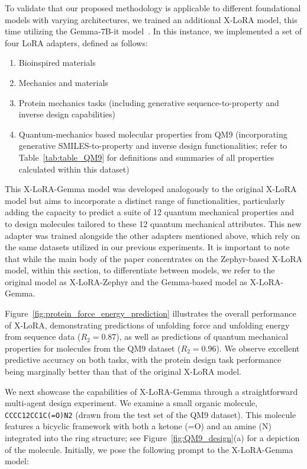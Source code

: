 To validate that our proposed methodology is applicable to different foundational models with varying architectures, we trained an additional X-LoRA model, this time utilizing the Gemma-7B-it model~\cite{Google/gemma-7b-itFace}. In this instance, we implemented a set of four LoRA adapters, defined as follows:

\begin{enumerate}
    \item Bioinspired materials \item Mechanics and materials \item Protein mechanics tasks (including generative sequence-to-property and inverse design capabilities) \item Quantum-mechanics based molecular properties from QM9 (incorporating generative SMILES-to-property and inverse design functionalities; refer to Table~\ref{tab:table_QM9} for definitions and summaries of all properties calculated within this dataset)~\cite{Ruddigkeit2012EnumerationGDB-17,Ramakrishnan2015ElectronicSpace}
\end{enumerate}

This X-LoRA-Gemma model was developed analogously to the original X-LoRA model but aims to incorporate a distinct range of functionalities, particularly adding the capacity to predict a suite of 12 quantum mechanical properties and to design molecules tailored to these 12 quantum mechanical attributes. This new adapter was trained alongside the other adapters mentioned above, which rely on the same datasets utilized in our previous experiments. It is important to note that while the main body of the paper concentrates on the Zephyr-based X-LoRA model, within this section, to differentiate between models, we refer to the original model as X-LoRA-Zephyr and the Gemma-based model as X-LoRA-Gemma.

Figure~\ref{fig:protein_force_energy_prediction} illustrates the overall performance of X-LoRA, demonstrating predictions of unfolding force and unfolding energy from sequence data ($R_2 = 0.87$), as well as predictions of quantum mechanical properties for molecules from the QM9 dataset ($R_2 = 0.96$). We observe excellent predictive accuracy on both tasks, with the protein design task performance being marginally better than that of the original X-LoRA model.

We next showcase the capabilities of X-LoRA-Gemma through a straightforward multi-agent design experiment. We examine a small organic molecule, \texttt{CCCC12CC1C(=O)N2} (drawn from the test set of the QM9 dataset). This molecule features a bicyclic framework with both a ketone (=O) and an amine (N) integrated into the ring structure; see Figure~\ref{fig:QM9_design}(a) for a depiction of the molecule. Initially, we pose the following prompt to the X-LoRA-Gemma model:


